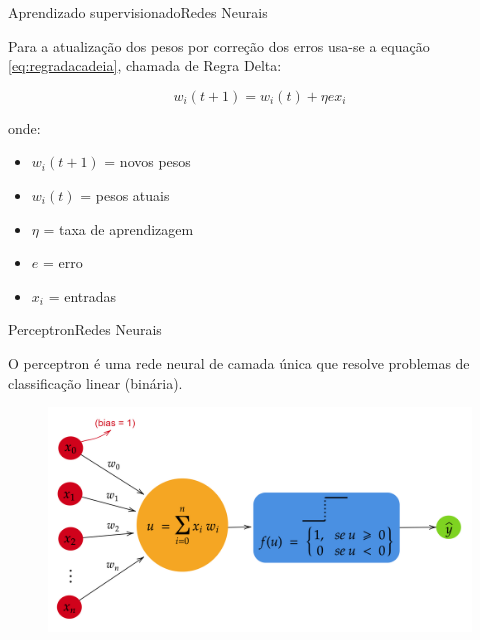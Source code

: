 \documentclass[t]{beamer}
\begin{document}

\begin{ftst}{Aprendizado supervisionado}{Redes Neurais}

Para a atualização dos pesos por correção dos erros usa-se a equação \ref{eq:regradacadeia}, chamada de Regra Delta:


\begin{equation}
    w_i(t+1) = w_i(t) + \eta e x_i 
    \label{eq:regradacadeia}
\end{equation}

onde:
\begin{itemize}
    \item $w_i(t+1)$ = novos pesos
    \item $w_i(t)$ = pesos atuais
    \item $\eta$ = taxa de aprendizagem
    \item $e$ = erro
    \item $x_i$ = entradas
\end{itemize}

\end{ftst}


\begin{ftst}{Perceptron}{Redes Neurais}

O perceptron é uma rede neural de camada única que resolve problemas de classificação linear (binária).
\begin{figure}
    \centering
    \includegraphics[scale=0.12]{Figuras/perceptron.png}
    \label{fig:perceptron}
\end{figure}

\end{ftst}

\end{document}
